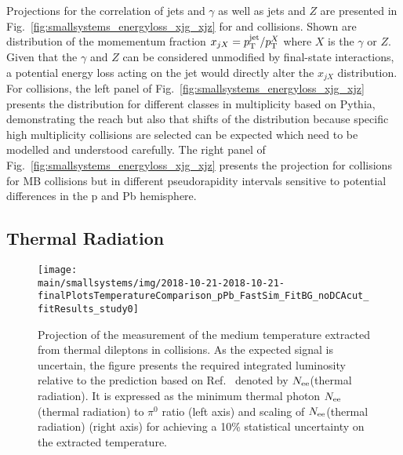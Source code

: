 \documentclass[../report.tex]{subfiles}
\providecommand{\main}{..}
\begin{document}
Projections for the correlation of jets and $\gamma$ as well as jets and $Z$ are presented in Fig.~\ref{fig:smallsystems_energyloss_xjg_xjz} for \pp and \pPb collisions. Shown are distribution of the momementum fraction $x_{jX} = p\sb{\scriptstyle\mathrm{T}}^{\rm jet}/p\sb{\scriptstyle\mathrm{T}}^X$ where $X$ is the $\gamma$ or $Z$. Given that the $\gamma$ and $Z$ can be considered unmodified by final-state interactions, a potential energy loss acting on the jet would directly alter the $x_{jX}$ distribution. For \pp collisions, the left panel of Fig.~\ref{fig:smallsystems_energyloss_xjg_xjz} presents the distribution for different classes in multiplicity based on Pythia, demonstrating the reach but also that shifts of the distribution because specific high multiplicity collisions are selected can be expected which need to be modelled and understood carefully. The right panel of Fig.~\ref{fig:smallsystems_energyloss_xjg_xjz} presents the projection for \pPb collisions for MB collisions but in different pseudorapidity intervals sensitive to potential differences in the p and Pb hemisphere.

\subsection{Thermal Radiation}
\label{sect:smallsystems_thermalradiation}

\begin{figure}[t]
\centering
\texttt{[image: \\main/smallsystems/img/2018-10-21-2018-10-21-finalPlotsTemperatureComparison\_pPb\_FastSim\_FitBG\_noDCAcut\_fitResults\_study0]}
\caption{Projection of the measurement of the medium temperature extracted from thermal dileptons in \pPb collisions. As the expected signal is uncertain, the figure presents the required integrated luminosity relative to the prediction based on Ref.~\cite{Rapp:2011is} denoted by $N_{\rm ee}$(thermal radiation). It is expressed as the minimum thermal photon $N_{\rm ee}$(thermal radiation) to $\pi^0$ ratio (left axis) and scaling of $N_{\rm ee}$(thermal radiation) (right axis) for achieving a 10\% statistical uncertainty on the extracted temperature.}
\label{fig:smallsystems_thermal_radition}
\end{figure}
\end{document}
